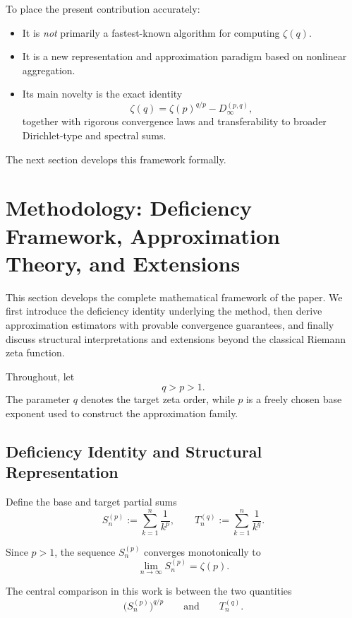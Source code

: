 \documentclass[11pt]{article}
\numberwithin{equation}{section}
\theoremstyle{definition}
\begin{document}
To place the present contribution accurately:

\begin{itemize}
\item It is \emph{not} primarily a fastest-known algorithm for computing \(\zeta(q)\).

\item It is a new representation and approximation paradigm based on nonlinear aggregation.

\item Its main novelty is the exact identity
\[
\zeta(q)=\zeta(p)^{q/p}-D_\infty^{(p,q)},
\]
together with rigorous convergence laws and transferability to broader Dirichlet-type and spectral sums.
\end{itemize}

The next section develops this framework formally.

\section{Methodology: Deficiency Framework, Approximation Theory, and Extensions}
\label{sec:methodology}

This section develops the complete mathematical framework of the paper. We first introduce the deficiency identity underlying the method, then derive approximation estimators with provable convergence guarantees, and finally discuss structural interpretations and extensions beyond the classical Riemann zeta function.

Throughout, let
\[
q>p>1.
\]
The parameter \(q\) denotes the target zeta order, while \(p\) is a freely chosen base exponent used to construct the approximation family.

\subsection{Deficiency Identity and Structural Representation}

Define the base and target partial sums
\[
S_n^{(p)}:=\sum_{k=1}^{n}\frac{1}{k^p},
\qquad
T_n^{(q)}:=\sum_{k=1}^{n}\frac{1}{k^q}.
\]

Since \(p>1\), the sequence \(S_n^{(p)}\) converges monotonically to
\[
\lim_{n\to\infty}S_n^{(p)}=\zeta(p).
\]

The central comparison in this work is between the two quantities
\[
\bigl(S_n^{(p)}\bigr)^{q/p}
\qquad\text{and}\qquad
T_n^{(q)}.
\]
\end{document}
